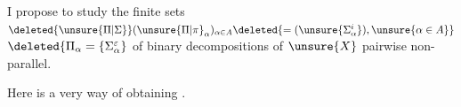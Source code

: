 I propose to study the finite
 sets
$\deleted{\unsure{\Pi|\Sigma}}(\unsure{\Pi|\pi}_\alpha)_{\alpha\in A}
\deleted{=(\unsure{\Sigma_\alpha^i}),\unsure{\alpha\in A}}$
$\deleted{\Pi_\alpha=\{\Sigma_\alpha^\varepsilon}$
of binary decompositions of $\unsure{X}$ pairwise non-parallel.

Here is a very  way
of obtaining  .
